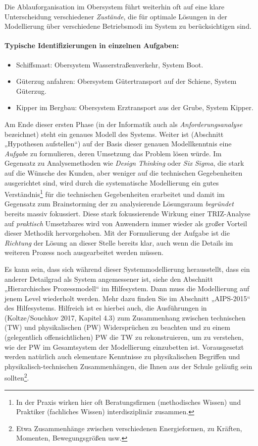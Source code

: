 \documentclass[11pt,a4paper]{article}
\begin{document}
Die Ablauforganisation im Obersystem führt weiterhin oft auf eine klare
Unterscheidung verschiedener \emph{Zustände}, die für optimale Lösungen in der
Modellierung über verschiedene Betriebsmodi im System zu berücksichtigen sind.

\paragraph{Typische Identifizierungen in einzelnen Aufgaben:}
\begin{itemize}\itemsep0pt
\item Schiffsmast: Obersystem Wasserstraßenverkehr, System Boot.
\item Güterzug anfahren: Obersystem Gütertransport auf der Schiene, System
  Güterzug. 
\item Kipper im Bergbau: Obersystem Erztransport aus der Grube, System
  Kipper. 
\end{itemize}

Am Ende dieser ersten Phase (in der Informatik auch als
\emph{Anforderungsanalyse} bezeichnet) steht ein genaues Modell des Systems.
Weiter ist (Abschnitt „Hypothesen aufstellen“) auf der Basis dieser genauen
Modellkenntnis eine \emph{Aufgabe} zu formulieren, deren Umsetzung das Problem
lösen würde. Im Gegensatz zu Analysemethoden wie \emph{Design Thinking} oder
\emph{Six Sigma}, die stark auf die Wünsche des Kunden, aber weniger auf die
technischen Gegebenheiten ausgerichtet sind, wird durch die systematische
Modellierung ein gutes Verständnis\footnote{In der Praxis wirken hier oft
  Beratungsfirmen (methodisches Wissen) und Praktiker (fachliches Wissen)
  interdisziplinär zusammen.} für die technischen Gegebenheiten erarbeitet und
damit im Gegensatz zum Brainstorming der zu analysierende Lösungsraum
\emph{begründet} bereits massiv fokussiert.  Diese stark fokussierende Wirkung
einer TRIZ-Analyse auf \emph{praktisch} Umsetzbares wird von Anwendern immer
wieder als großer Vorteil dieser Methodik hervorgehoben.  Mit der Formulierung
der Aufgabe ist die \emph{Richtung} der Lösung an dieser Stelle bereits klar,
auch wenn die Details im weiteren Prozess noch ausgearbeitet werden müssen.

Es kann sein, dass sich während dieser Systemmodellierung herausstellt, dass
ein anderer Detailgrad als System angemessener ist, siehe den Abschnitt
„Hierarchisches Prozessmodell“ im Hilfesystem.  Dann muss die Modellierung auf
jenem Level wiederholt werden. Mehr dazu finden Sie im Abschnitt „AIPS-2015“
des Hilfesystems.  Hilfreich ist es hierbei auch, die Ausführungen in
(Koltze/Souchkov 2017, Kapitel 4.3) zum Zusammenhang zwischen technischen (TW)
und physikalischen (PW) Widersprüchen zu beachten und zu einem (gelegentlich
offensichtlichen) PW die TW zu rekonstruieren, um zu verstehen, wie der PW im
Gesamtsystem der Modellierung einzubetten ist.  Vorausgesetzt werden natürlich
auch elementare Kenntnisse zu physikalischen Begriffen und
physikalisch-technischen Zusammenhängen, die Ihnen aus der Schule geläufig
sein sollten\footnote{Etwa Zusammenhänge zwischen verschiedenen Energieformen,
  zu Kräften, Momenten, Bewegungsgrößen usw.}.
\end{document}
